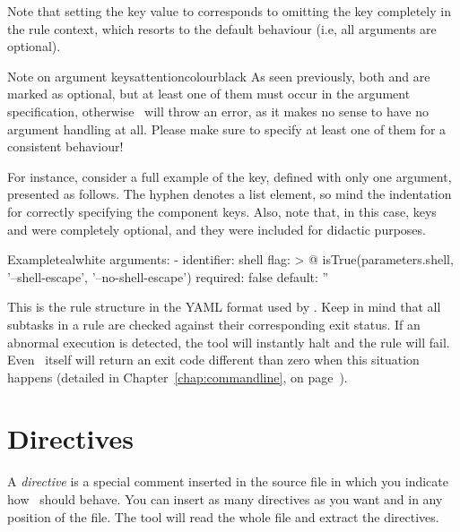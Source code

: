 \begin{description}
\begin{description}
Note that setting the  key value to  corresponds to omitting the key completely in the rule context, which resorts to the default behaviour (i.e, all arguments are optional).
\end{description}

\begin{messagebox}{Note on argument keys}{attentioncolour}{\icattention}{black}
As seen previously, both  and  are marked as optional, but at least one of them must occur in the argument specification, otherwise \arara\ will throw an error, as it makes no sense to have no argument handling at all. Please make sure to specify at least one of them for a consistent behaviour!
\end{messagebox}

For instance, consider a full example of the  key, defined with only one argument, presented as follows. The hyphen denotes a list element, so mind the indentation for correctly specifying the component keys. Also, note that, in this case, keys  and  were completely optional, and they were included for didactic purposes.

\begin{codebox}{Example}{teal}{\icnote}{white}
arguments:
- identifier: shell
  flag: >
    @{
        isTrue(parameters.shell,
               '--shell-escape',
               '--no-shell-escape')
    }
  required: false
  default: ''
\end{codebox}
\end{description}

This is the rule structure in the \gls{YAML} format used by \arara. Keep in mind that all subtasks in a rule are checked against their corresponding exit status. If an abnormal execution is detected, the tool will instantly halt and the rule will fail. Even \arara\ itself will return an exit code different than zero when this situation happens (detailed in Chapter~\ref{chap:commandline}, on page~\pageref{chap:commandline}).

\section{Directives}
\label{sec:directives}

A \emph{directive} is a special comment inserted in the source file in which you indicate how \arara\ should behave. You can insert as many directives as you want and in any position of the file. The tool will read the whole file and extract the directives.

